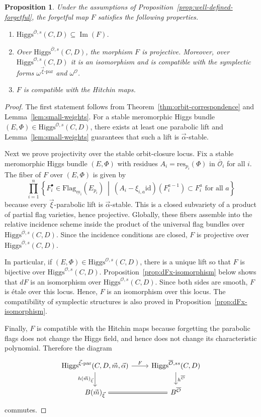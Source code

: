 \documentclass[11pt]{amsart}
\theoremstyle{plain}
\newtheorem{proposition}[theorem]{Proposition}
\theoremstyle{definition}
\theoremstyle{remark}
\newcommand{\id}{\mathrm{id}}
\newcommand{\ov}[1]{\overline{#1}}
\newcommand{\Flag}{\mathrm{Flag}}
\newcommand{\cO}{\mathcal O}
\newcommand{\Higgs}{\mathrm{Higgs}}
\def\a{\alpha}
\def\res{\mathrm{res}}
\def\vxi{\vec{\xi}}
\def\vm{\vec{m}}
\def\va{\vec{\a}}
\def\um{{\underline{m}}}
\begin{document}
\begin{proposition}\label{prop:F properties}
Under the assumptions of Proposition~\ref{prop:well-defined-forgetful}, the forgetful map $F$ satisfies the following properties.
\begin{enumerate}
\item $\Higgs^{\ov\cO,s}(C,D)\subseteq \operatorname{Im}(F)$.
\item Over $\Higgs^{\ov\cO,s}(C,D)$, the morphism $F$ is projective. Moreover, over $\Higgs^{\cO,s}(C,D)$ it is an isomorphism and is compatible with the symplectic forms $\omega^{\vxi\text{-par}}$ and $\omega^{\cO}$.
\item $F$ is compatible with the Hitchin maps.
\end{enumerate}
\end{proposition}

\begin{proof}
The first statement follows from Theorem~\ref{thm:orbit-correspondence} and Lemma~\ref{lem:small-weights}. For a stable meromorphic Higgs bundle $(E,\Phi) \in \Higgs^{\ov\cO,s}(C,D)$, there exists at least one parabolic lift and Lemma~\ref{lem:small-weights} guarantees that such a lift is $\va$-stable. 

Next we prove projectivity over the stable orbit-closure locus. Fix a stable meromorphic Higgs bundle $(E,\Phi)$ with residues $A_i=\res_{p_i}(\Phi)$ in $\ov\cO_i$ for all $i$. The fiber of $F$ over $(E,\Phi)$ is given by 
\[
\prod_{i=1}^n
\left\{
F_i^\bullet\in \Flag_{\um_i}(E_{p_i})
\ \middle|\
(A_i-\xi_{i,a}\id)(F_i^{a-1})\subset F_i^a
\text{ for all }a
\right\}
\]
because every $\vxi$-parabolic lift is $\va$-stable. This is a closed subvariety of a product of partial flag varieties, hence projective. Globally, these fibers assemble into the relative incidence scheme inside the product of the universal flag bundles over $\Higgs^{\ov\cO,s}(C,D)$. Since the incidence conditions are closed, $F$ is projective over $\Higgs^{\ov\cO,s}(C,D)$. 

In particular, if $(E,\Phi)\in\Higgs^{\cO,s}(C,D)$, there is a unique lift so that $F$ is bijective over $\Higgs^{\cO,s}(C,D)$. Proposition~\ref{prop:dFx-isomorphism} below shows that $dF$ is an isomorphism over $\Higgs^{\cO,s}(C,D)$. Since both sides are smooth, $F$ is \'{e}tale over this locus. Hence, $F$ is an isomorphism over this locus. The compatibility of symplectic structures is also proved in Proposition~\ref{prop:dFx-isomorphism}.
 
Finally, $F$ is compatible with the Hitchin maps because forgetting the parabolic flags does not change the Higgs field, and hence does not change its characteristic polynomial. Therefore the diagram
\[
\begin{tikzcd}
\Higgs^{\vec\xi\text{-par}}(C,D,\vec m,\vec\alpha) \arrow[r, "F"] \arrow[d, "h(\vm)_{\vxi}"'] 
& \Higgs^{\ov\cO,ss}(C,D) \arrow[d, "h^{\ov\cO}"] \\
 B(\vec m)_{\vec\xi} \arrow[r, equal]& B^{\ov\cO}
\end{tikzcd}
\]
commutes.
\end{proof}
\end{document}

